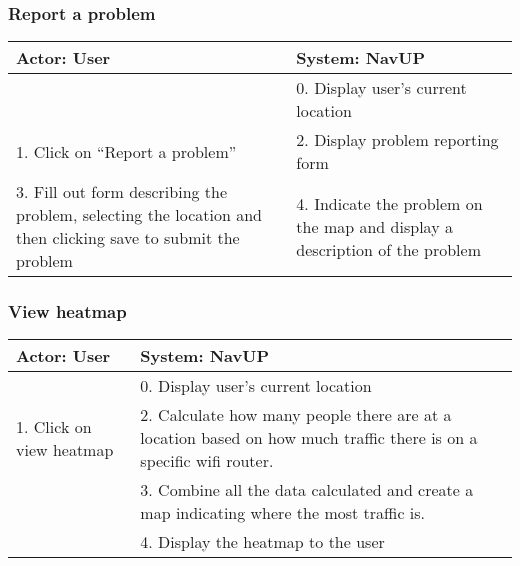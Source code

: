 \documentclass[12pt,a4paper]{article}
\begin{document}
		\subsubsection{Report a problem}
		\begin{tabular}{|p{7cm}|p{7cm}|}
			\hline
			\textbf{Actor: User} & \textbf{System: NavUP}\\
			\hline
			 & 0. Display user’s current location\\
			\hline
			1. Click on “Report a problem” & 2. Display problem reporting form \\
			\hline
			3. Fill out form describing the problem, selecting the location and then clicking save to submit the problem & 4. Indicate the problem on the map and display a description of the problem\\
			\hline
		\end{tabular}
		\subsubsection{View heatmap}
		\begin{tabular}{|p{7cm}|p{7cm}|}
			\hline
			\textbf{Actor: User} & \textbf{System: NavUP}\\
			\hline
			 & 0. Display user’s current location\\
			\hline
			1. Click on view heatmap & 2. Calculate how many people there are at a location based on how much traffic there is on a specific wifi router. \\
			\hline
			 & 3. Combine all the data calculated and create a map indicating where the most traffic is.\\
			\hline
			& 4. Display the heatmap to the user\\
			\hline
		\end{tabular}
\end{document}
